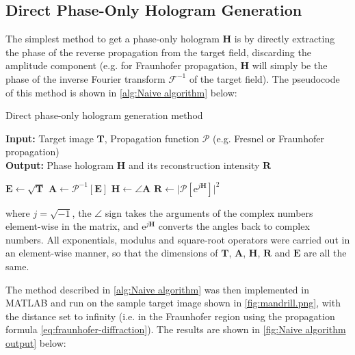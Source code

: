 \subsection{Direct Phase-Only Hologram Generation}\label{sec:Naive algorithm}
The simplest method to get a phase-only hologram $\textbf{H}$ is by directly extracting the phase of the reverse propagation from the target field, discarding the amplitude component (e.g. for Fraunhofer propagation, $\textbf{H}$ will simply be the phase of the inverse Fourier transform $\mathcal{F} ^{-1}$ of the target field). The pseudocode of this method is shown in \cref{alg:Naive algorithm} below:
\begin{algorithm}[H]
  \caption{Direct phase-only hologram generation method}\label{alg:Naive algorithm}
  \textbf{Input:} Target image $\textbf{T}$, Propagation function $\mathcal{P}$ (e.g. Fresnel or Fraunhofer propagation)\\
  \textbf{Output:} Phase hologram $\textbf{H}$ and its reconstruction intensity $\textbf{R}$
  \begin{algorithmic}
    \State $\textbf{E} \gets \sqrt{\textbf{T}}$
    \State $\textbf{A} \gets \mathcal{P}^{-1}[\textbf{E}]$
    \State $\textbf{H} \gets \angle \textbf{A}$
    \State $\textbf{R} \gets \vert \mathcal{P}[\mathrm{e}^{j\textbf{H}}] \vert ^2 $
  \end{algorithmic}
\end{algorithm}
where $j = \sqrt{-1} $, the $\angle$ sign takes the arguments of the complex numbers element-wise in the matrix, and $\mathrm{e}^{j\textbf{H}}$ converts the angles back to complex numbers. All exponentials, modulus and square-root operators were carried out in an element-wise manner, so that the dimensions of $\textbf{T}$, $\textbf{A}$, $\textbf{H}$, $\textbf{R}$ and $\textbf{E}$ are all the same.

The method described in \cref{alg:Naive algorithm} was then implemented in MATLAB and run on the sample target image shown in \cref{fig:mandrill.png}, with the distance set to infinity (i.e. in the Fraunhofer region using the propagation formula \cref{eq:fraunhofer-diffraction}). The results are shown in \cref{fig:Naive algorithm output} below:

